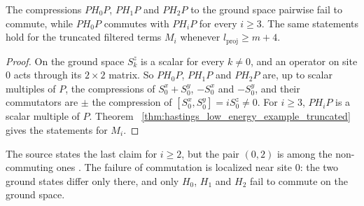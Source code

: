 \begin{lemma}
    \label{thm:hastings_low_energy_example_commutators}
    \leanok
    The compressions $PH_0P$, $PH_1P$ and $PH_2P$ to the ground space
    pairwise fail to commute, while $PH_0P$ commutes with $PH_iP$ for every
    $i\ge3$. The same statements hold for the truncated filtered terms
    $M_i$ whenever $l_{\mathrm{proj}}\ge m+4$.
\end{lemma}
\begin{proof}\leanok
    On the ground space $S^z_k$ is a scalar for every $k\neq0$, and an
    operator on site $0$ acts through its $2\times2$ matrix. So $PH_0P$,
    $PH_1P$ and $PH_2P$ are, up to scalar multiples of $P$, the
    compressions of $S^x_0+S^y_0$, $-S^x_0$ and $-S^y_0$, and their
    commutators are $\pm$ the compression of $[S^x_0,S^y_0]=iS^z_0\neq0$. For
    $i\ge3$, $PH_iP$ is a scalar multiple of $P$. Theorem~
    \ref{thm:hastings_low_energy_example_truncated} gives the statements
    for $M_i$.
\end{proof}

The source states the last claim for $i\ge2$, but the pair $(0,2)$ is among
the non-commuting ones \cite{gap:hastings05_low_energy_example}. The failure
of commutation is localized near site $0$: the two ground states differ only
there, and only $H_0$, $H_1$ and $H_2$ fail to commute on the ground space.
